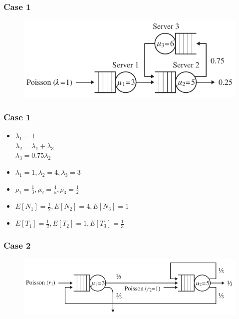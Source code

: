 \documentclass[10pt,notes]{beamer}
\begin{document}
\begin{frame}
    \frametitle{Case 1}
    \begin{figure}
        \includegraphics[width=0.75\linewidth]{images/case1.png}
    \end{figure}
\end{frame}

\begin{frame}
    \frametitle{Case 1}
    \begin{itemize}
        \item $\lambda_1 = 1$ \\
            $\lambda_2 = \lambda_1 + \lambda_3$ \\
            $\lambda_3 = 0.75\lambda_2$
        \item $\lambda_1 = 1, \lambda_2 = 4, \lambda_3 = 3$
        \item $\rho_1 = \frac{1}{3}, \rho_2 = \frac{4}{5}, \rho_3 = \frac{1}{2}$
        \item $E[N_1] = \frac{1}{2}, E[N_2] = 4, E[N_3] = 1$
        \item $E[T_1] = \frac{1}{2}, E[T_2] = 1, E[T_3] = \frac{1}{3}$
    \end{itemize}
\end{frame}

\begin{frame}
    \frametitle{Case 2}
    \begin{figure}
        \includegraphics[width=0.7\linewidth]{images/case2.png}
    \end{figure}
\end{frame}
\end{document}
